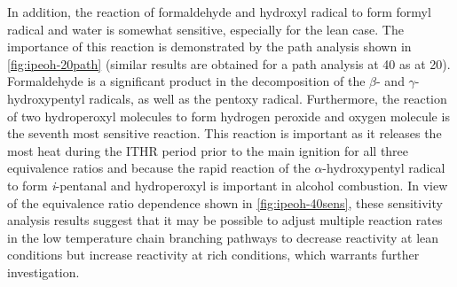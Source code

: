 \documentclass[../main.tex]{subfiles}
\begin{document}
In addition, the reaction of formaldehyde and hydroxyl radical to form
formyl radical and water is somewhat sensitive, especially for
the lean case. The importance of this reaction is demonstrated by the
path analysis shown in \cref{fig:ipeoh-20path} (similar results are
obtained for a path analysis at \SI{40}{\atmosphere} as at
\SI{20}{\atmosphere}). Formaldehyde is a significant product in
the decomposition of the $\beta$- and $\gamma$-hydroxypentyl radicals,
as well as the pentoxy radical. Furthermore, the reaction of two
hydroperoxyl molecules to form hydrogen peroxide and oxygen molecule is the
seventh most sensitive reaction. This reaction is important as it releases
the most heat during the ITHR period prior to the main ignition for all
three equivalence ratios and because the rapid reaction of the
$\alpha$-hydroxypentyl radical to form \textit{i}-pentanal and hydroperoxyl
is important in alcohol combustion. In view of the equivalence ratio
dependence shown in \cref{fig:ipeoh-40sens}, these sensitivity analysis
results suggest that it may be possible to adjust multiple reaction
rates in the low temperature chain branching pathways to decrease
reactivity at lean conditions but increase reactivity at rich
conditions, which warrants further investigation.

\end{document}
